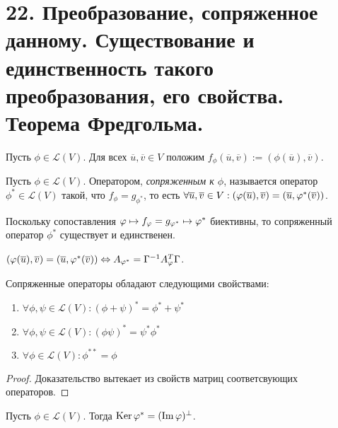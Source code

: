 \section{22. Преобразование, сопряженное данному. Существование и единственность такого преобразования, его свойства. Теорема Фредгольма.}

\begin{definition}
	Пусть $\phi \in \mathcal{L}(V)$. Для всех $\overline{u}, \overline{v} \in V$ положим $f_\phi(\overline{u}, \overline{v}) := (\phi(\overline{u}), \overline{v})$.
\end{definition}

\begin{definition}
	Пусть $\phi \in \mathcal{L}(V)$. Оператором, \textit{сопряженным к $\phi$}, называется оператор $\phi^* \in \mathcal{L}(V)$ такой, что $f_\phi = g_{\phi^*}$, то есть $\forall \overline{u}, \overline{v} \in V: (\phi(\overline{u}), \overline{v}) \hm{=} (\overline{u}, \phi^*(\overline{v}))$.
\end{definition}

\begin{note}
	Поскольку сопоставления $\phi \mapsto f_\phi = g_{\phi^*} \hm{\mapsto} \phi^*$ биективны, то сопряженный оператор $\phi^*$ существует и единственен.
\end{note}

\begin{note}
    $(\phi(\overline{u}), \overline{v}) \hm{=} (\overline{u}, \phi^*(\overline{v})) \lra A_{\phi^*} = \Gamma^{-1}A_{\phi}^{T}\Gamma$.
\end{note}

\begin{proposition} Сопряженные операторы обладают следующими свойствами:
	\begin{enumerate}
		\item $\forall \phi, \psi \in \mathcal{L}(V): (\phi + \psi)^* = \phi^* + \psi^*$
		\item $\forall \phi, \psi \in \mathcal{L}(V): (\phi\psi)^* = \psi^*\phi^*$
		\item $\forall \phi \in \mathcal{L}(V): \phi^{**} = \phi$
	\end{enumerate}
\end{proposition}

\begin{proof}
    Доказательство вытекает из свойств матриц соответсвующих операторов.
\end{proof}

\begin{theorem}[Фредгольма]
	Пусть $\phi \in \mathcal{L}(V)$. Тогда $\ke{\phi^*} \hm{=} (\im{\phi})^\perp$.
\end{theorem}

